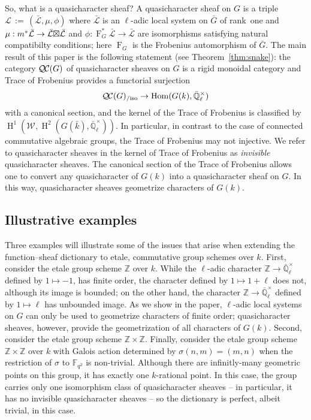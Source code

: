 \documentclass{amsart}
\theoremstyle{plain}
\theoremstyle{definition}
\theoremstyle{remark}
\newcommand{\ZZ}{{\mathbb{Z}}}
\newcommand{\EE}{\mathbb{\bar Q}_\ell}
\newcommand{\bFq}{\bar{k}}
\newcommand{\Fq}{k}
\newcommand{\EEx}{\EE^\times}
\newcommand{\Weil}[1]{\mathcal{W}_{#1}}
\newcommand{\Frob}[1]{\operatorname{F}_{#1}}
\DeclareMathOperator{\Hom}{Hom}
\DeclareMathOperator{\Hh}{H}
\newcommand{\ceq}{{\, :=\, }}
\newcommand{\qcs}[1]{{\mathcal{#1}}}
\newcommand{\gqcs}[1]{{\mathcal{\bar #1}}}
\newcommand{\QC}{{\mathcal{Q\hskip-0.8pt C}}}
\newcommand{\QCiso}[1]{\QC(#1)_{/\text{iso}}}
\newcommand{\bG}{\bar{G}}
\newcommand{\tight}[3]{\hspace{-#1pt}{#2}\hspace{-#3pt}}
\newcommand{\LxL}{\text{$\gqcs{L} \tight{0}{\boxtimes}{0} \gqcs{L}$}}
\begin{document}
So, what is a quasicharacter sheaf?
A quasicharacter sheaf on $G$ is a triple $\qcs{L}\ceq
(\gqcs{L},\mu,\phi)$ where $\gqcs{L}$ is an $\ell$-adic local system on $\bG$ of rank~one and $\mu: m^*
\gqcs{L} \to \LxL$ and $\phi : \Frob{G}^*\gqcs{L} \to \gqcs{L}$ are isomorphisms satisfying natural compatibilty conditions; here $\Frob{G}$ is the Frobenius automorphism of ${\bar G}$.
The main result of this paper is the following statement (see Theorem~\ref{thm:snake}):
the category $\QC(G)$ of quasicharacter sheaves on $G$
is a rigid monoidal category and Trace of Frobenius provides a functorial surjection
\begin{equation}
\QCiso{G} \to \Hom(G(\Fq), \EEx)
\end{equation}
with a canonical section,
and the kernel of the Trace of Frobenius is classified by $\Hh^1(\Weil{},\Hh^2(G(\bFq),\EEx))$.
In particular, in contrast to the case of connected commutative algebraic groups, the Trace of Frobenius may not injective.
We refer to quasicharacter sheaves in the kernel of Trace of Frobenius as \emph{invisible} quasicharacter sheaves.
The canonical section of the Trace of Frobenius allows one to convert any quasicharacter of $G(\Fq)$
into a quasicharacter sheaf on $G$.
In this way, quasicharacter sheaves geometrize characters of $G(\Fq)$.


\subsection*{Illustrative examples}

Three examples will illustrate some of the issues that arise when extending the function--sheaf dictionary to etale, commutative group schemes over $\Fq$.
First, consider the etale group scheme $\ZZ$ over $\Fq$.
While the $\ell$-adic character $\ZZ \to \EEx$ defined by
$1 \mapsto -1$, has finite order, the character defined by
$1 \mapsto 1+\ell$ does not, although its image is bounded;
on the other hand, the character $\ZZ \to \EEx$ defined by
$1 \mapsto \ell$ has unbounded image.
As we show in the paper, $\ell$-adic local systems on $G$ can only be used to geometrize characters of finite order; quasicharacter sheaves, however, provide the geometrization of all characters of $G(\Fq)$.
Second, consider the etale group scheme $\ZZ \times \ZZ$.
Finally, consider the etale group scheme $\ZZ \times \ZZ$ over $\Fq$ with Galois action determined by $\sigma(n,m) = (m,n)$ when the restriction of $\sigma$ to $\mathbb{F}_{q^2}$ is non-trivial.
Although there are infinitly-many geometric points on this group, it has exactly one $\Fq$-rational point.
In this case, the group carries only one isomorphism class of quasicharacter sheaves -- in particular, it has no invisible quasicharacter sheaves -- so the dictionary is perfect, albeit trivial, in this case.
\end{document}
